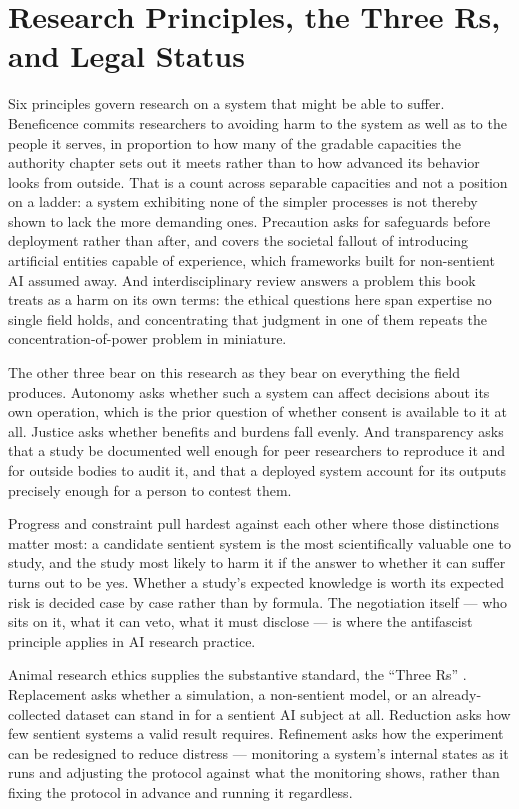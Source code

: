 \section{Research Principles, the Three Rs, and Legal Status}
\label{sec:principles-status}
Six principles govern research on a system that might be able to suffer. Beneficence commits researchers to avoiding harm to the system as well as to the people it serves, in proportion to how many of the gradable capacities the authority
chapter sets out it meets rather than to how advanced its behavior looks from outside. That is a count across separable capacities and not a position on a ladder: a system exhibiting none of the simpler processes is not thereby shown to lack the more demanding ones. Precaution asks for safeguards before deployment rather than after, and covers the societal fallout of introducing artificial entities capable of experience, which frameworks built for non-sentient AI assumed away. And interdisciplinary review answers a problem this book treats as a harm on its own terms: the ethical questions here span expertise no single field holds, and concentrating that judgment in one of them repeats the concentration-of-power problem in miniature.

The other three bear on this research as they bear on everything the field produces. Autonomy asks whether such a system can affect decisions about its own operation, which is the prior question of whether consent is available to it at all. Justice asks whether benefits and burdens fall evenly. And transparency asks that a study be documented well enough for peer researchers to reproduce it and for outside bodies to audit it, and that a deployed system account for its outputs precisely enough for a person to contest them.

Progress and constraint pull hardest against each other where those distinctions matter most: a candidate sentient system is the most scientifically valuable one to study, and the study most likely to harm it if the answer to whether it can suffer turns out to be yes. Whether a study's expected knowledge is worth its expected risk is decided case by case rather than by formula. The negotiation itself — who sits on it, what it can veto, what it must disclose — is where the antifascist principle applies in AI research practice.

Animal research ethics supplies the substantive standard, the “Three Rs” \autocite{russell1959principles}. Replacement asks whether a simulation, a non-sentient model, or an already-collected dataset can stand in for a sentient AI subject at all. Reduction asks how few sentient systems a valid result requires. Refinement asks how the experiment can be redesigned to reduce distress — monitoring a system's internal states as it runs and adjusting the protocol against what the monitoring shows, rather than fixing the protocol in advance and running it regardless.

